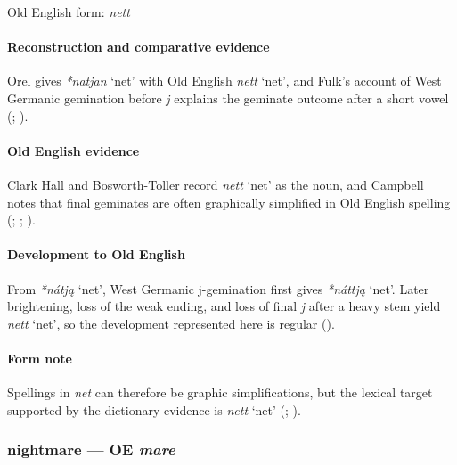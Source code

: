 \documentclass[
  british,
  a4paper,
]{article}
\providecommand{\Recon}[1]{\emph{*#1}}
\begin{document}
Old English form: \emph{nett}

\paragraph{Reconstruction and comparative
evidence}\label{reconstruction-and-comparative-evidence-44}

Orel gives \Recon{natjan} `net' with Old English {\emph{nett}} `net',
and Fulk's account of West Germanic gemination before \emph{j} explains
the geminate outcome after a short vowel (; ).

\paragraph{Old English evidence}\label{old-english-evidence-44}

Clark Hall and Bosworth-Toller record {\emph{nett}} `net' as the noun,
and Campbell notes that final geminates are often graphically simplified
in Old English spelling (;
;
).

\paragraph{Development to Old
English}\label{development-to-old-english-44}

From \Recon{nátją} `net', West Germanic j-gemination first gives
\Recon{náttją} `net'. Later brightening, loss of the weak ending, and
loss of final \emph{j} after a heavy stem yield {\emph{nett}} `net', so
the development represented here is regular
().

\paragraph{Form note}\label{form-note-13}

Spellings in \emph{net} can therefore be graphic simplifications, but
the lexical target supported by the dictionary evidence is {\emph{nett}}
`net' (;
).

\subsubsection{\texorpdfstring{nightmare --- OE
\emph{mare}}{nightmare --- OE mare}}\label{nightmare-oe-mare}
\end{document}
